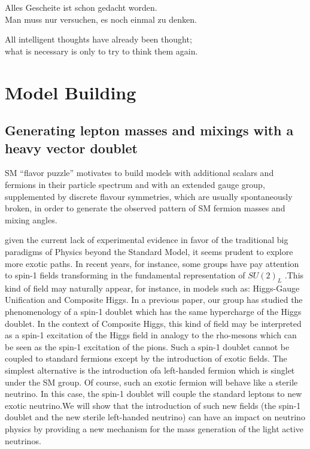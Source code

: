 \begin{savequote}[8cm]
Alles Gescheite ist schon gedacht worden.\\
Man muss nur versuchen, es noch einmal zu denken.

All intelligent thoughts have already been thought;\\
what is necessary is only to try to think them again.
\end{savequote}

\chapter{\label{ch:2-litreview}Model Building}

\minitoc

\section{Generating lepton masses and mixings with a heavy vector doublet}  

SM ``flavor puzzle'' motivates to build models with additional scalars
and fermions in their particle spectrum and with an extended gauge group,
supplemented by discrete flavour symmetries, which are usually spontaneously
broken, in order to generate the observed pattern of SM fermion masses and
mixing angles.


 given the current lack of experimental evidence in favor
of the traditional big paradigms of Physics beyond the Standard Model, it
seems prudent to explore more exotic paths. In recent years, for instance,
some groups have pay attention to spin-1 fields transforming in the
fundamental representation of $SU(2)_L$ %
.This kind of
field may naturally appear, for instance, in models such as: Higgs-Gauge
Unification  %
and Composite Higgs. 
In a previous paper, our group has studied the phenomenology of a spin-1 doublet which has the
same hypercharge of the Higgs doublet. %
In the context of Composite Higgs, this kind of field may be interpreted as a spin-1 excitation of the Higgs field in analogy
to the rho-mesons which can be seen as the spin-1 excitation of the pions. Such a spin-1 doublet cannot be coupled to standard fermions except by the introduction of exotic fields. The simplest alternative is the introduction ofa left-handed fermion which is singlet under the SM group. Of course, such an exotic fermion will behave like a sterile neutrino. In this case, the spin-1 doublet will couple the standard leptons to new exotic neutrino.We will show that the introduction of such new fields (the spin-1 doublet and the new sterile left-handed neutrino) can have an impact on
neutrino physics by providing a new mechanism for the mass generation of the
light active neutrinos. 




